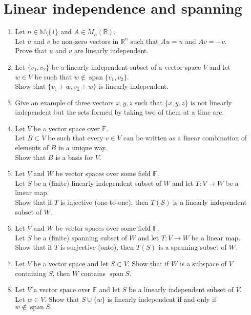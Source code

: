 \documentclass[12pt]{article}
\begin{document}
\section{Linear independence and spanning}
\begin{enumerate}
	\item Let $n \in \mathbb{N}\setminus\{1\}$ and $A \in M_n(\mathbb{R}).$ \\
	Let $u$ and $v$ be non-zero vectors in $\mathbb{R}^n$ such that $Au = u$ and $Av = -v.$\\
	Prove that $u$ and $v$ are linearly independent.
	\item Let $\{v_1,v_2\}$ be a linearly independent subset of a vector space $V$ and let $w\in V$ be such that $w \notin\operatorname{span}\{v_1,v_2\}$. \\
	Show that $\{v_1 + w, v_2 + w\}$ is linearly independent.
	\item Give an example of three vectors $x, y, z$ such that $\{x, y, z\}$ is not linearly independent but the sets formed by taking two of them at a time are.
	\item Let $V$ be a vector space over $\mathbb{F}.$\\
	Let $B \subset V$ be such that every $v \in V$ can be written as a linear combination of elements of $B$ in a unique way.\\
	Show that $B$ is a basis for $V.$
	\item Let $V$ and $W$ be vector spaces over some field $\mathbb{F}.$\\
	Let $S$ be a (finite) linearly independent subset of $W$ and let $T:V\to W$ be a linear map.\\
	Show that if $T$ is injective (one-to-one), then $T(S)$ is a linearly independent subset of $W.$
	\item Let $V$ and $W$ be vector spaces over some field $\mathbb{F}.$\\
	Let $S$ be a (finite) spanning subset of $W$ and let $T:V\to W$ be a linear map.\\
	Show that if $T$ is surjective (onto), then $T(S)$ is a spanning subset of $W.$
	\item Let $V$ be a vector space and let $S \subset V.$ Show that if $W$ is a subspace of $V$ containing $S$, then $W$ contains $\operatorname{span} S.$
	\item Let $V$ a vector space over $\mathbb{F}$ and let $S$ be a linearly independent subset of $V.$\\
	Let $w \in V.$ Show that $S \cup \{w\}$ is linearly independent if and only if $w \notin \operatorname{span} S.$

\end{enumerate}
\end{document}
